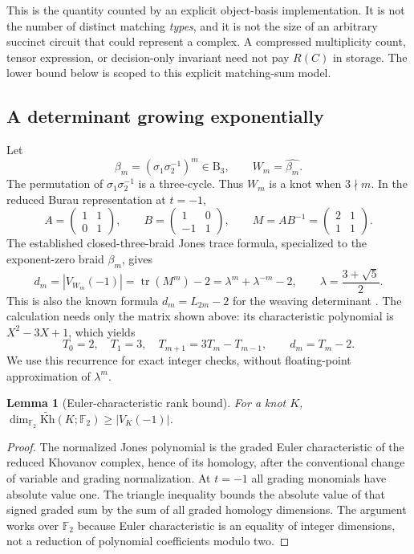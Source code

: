 \documentclass[11pt]{article}
\newtheorem{lemma}[theorem]{Lemma}
\theoremstyle{definition}
\theoremstyle{remark}
\newcommand{\B}{\mathrm B}
\newcommand{\F}{\mathbb F}
\newcommand{\Kh}{\widetilde{\mathrm{Kh}}}
\newcommand{\tr}{\operatorname{tr}}
\newcommand{\closure}[1]{\widehat{#1}}
\begin{document}
This is the quantity counted by an explicit object-basis implementation.
It is not the number of distinct matching \emph{types}, and it is not the
size of an arbitrary succinct circuit that could represent a complex.
A compressed multiplicity count, tensor expression, or decision-only
invariant need not pay $R(C)$ in storage. The lower bound below is scoped to
this explicit matching-sum model.

\subsection{A determinant growing exponentially}
Let
\[
 \beta_m=(\sigma_1\sigma_2^{-1})^m\in\B_3,
 \qquad W_m=\closure{\beta_m}.
\]
The permutation of $\sigma_1\sigma_2^{-1}$ is a three-cycle. Thus $W_m$ is a
knot when $3\nmid m$. In the reduced Burau representation at $t=-1$,
\[
 A=\begin{pmatrix}1&1\\0&1\end{pmatrix},\qquad
 B=\begin{pmatrix}1&0\\-1&1\end{pmatrix},\qquad
 M=AB^{-1}=\begin{pmatrix}2&1\\1&1\end{pmatrix}.
\]
The established closed-three-braid Jones trace formula, specialized to the
exponent-zero braid $\beta_m$, gives
\begin{equation}\label{eq:det}
 d_m=|V_{W_m}(-1)|=\tr(M^m)-2
     =\lambda^m+\lambda^{-m}-2,
 \qquad \lambda=\frac{3+\sqrt5}{2}.
\end{equation}
This is also the known formula $d_m=L_{2m}-2$ for the weaving determinant
\cite[\S2, Corollary 3.5]{weaving}. The calculation needs only the matrix
shown above: its characteristic polynomial is $X^2-3X+1$, which yields
\[
 T_0=2,\quad T_1=3,\quad T_{m+1}=3T_m-T_{m-1},\qquad d_m=T_m-2.
\]
We use this recurrence for exact integer checks, without floating-point
approximation of $\lambda^m$.

\begin{lemma}[Euler-characteristic rank bound]\label{lem:euler}
For a knot $K$, $\dim_{\F_2}\Kh(K;\F_2)\ge |V_K(-1)|$.
\end{lemma}
\begin{proof}
The normalized Jones polynomial is the graded Euler characteristic of the
reduced Khovanov complex, hence of its homology, after the conventional
change of variable and grading normalization. At $t=-1$ all grading
monomials have absolute value one. The triangle inequality bounds the
absolute value of that signed graded sum by the sum of all graded
homology dimensions. The argument works over $\F_2$ because Euler
characteristic is an equality of integer dimensions, not a reduction of
polynomial coefficients modulo two.
\end{proof}
\end{document}
